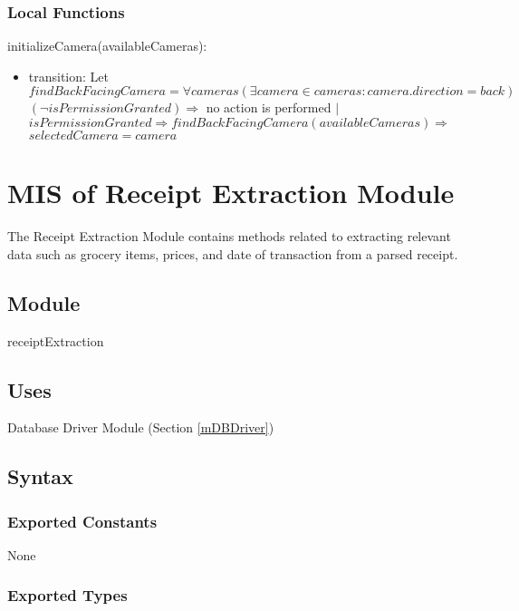 \documentclass[12pt, titlepage]{article}
\begin{document}
\subsubsection{Local Functions}

\noindent initializeCamera(availableCameras):
\begin{itemize}
  \item transition: Let $findBackFacingCamera = \forall cameras (\exists camera \in cameras : camera.direction = back)$ \\
                    $(\neg isPermissionGranted) \Rightarrow$ no action is performed $|$\\
                    $isPermissionGranted \Rightarrow findBackFacingCamera(availableCameras) \Rightarrow $ \\
                    $selectedCamera = camera$
\end{itemize}

\newpage

\section{MIS of Receipt Extraction Module} \label{mExtraction}

The Receipt Extraction Module contains methods related to extracting relevant data such as grocery items,
prices, and date of transaction from a parsed receipt.

\subsection{Module}

receiptExtraction

\subsection{Uses}

Database Driver Module (Section \ref{mDBDriver})

\subsection{Syntax}

\subsubsection{Exported Constants}

None

\subsubsection{Exported Types}
\end{document}
